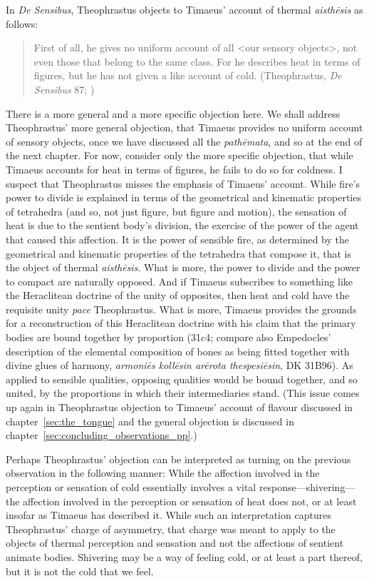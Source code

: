 In \emph{De Sensibus}, Theophrastus objects to Timaeus' account of thermal \emph{aisthēsis} as follows:
\begin{quote}
	First of all, he gives no uniform account of all <our sensory objects>, not even those that belong to the same class. For he describes heat in terms of figures, but he has not given a like account of cold. (Theophrastus, \emph{De Sensibus} 87; \citealt[147]{Stratton:1917vn})
\end{quote}
There is a more general and a more specific objection here. We shall address Theophrastus' more general objection, that Timaeus provides no uniform account of sensory objects, once we have discussed all the \emph{pathēmata}, and so at the end of the next chapter. For now, consider only the more specific objection, that while Timaeus accounts for heat in terms of figures, he fails to do so for coldness. I suspect that Theophrastus misses the emphasis of Timaeus' account. While fire's power to divide is explained in terms of the geometrical and kinematic properties of tetrahedra (and so, not just figure, but figure and motion), the sensation of heat is due to the sentient body's division, the exercise of the power of the agent that caused this affection. It is the power of sensible fire, as determined by the geometrical and kinematic properties of the tetrahedra that compose it, that is the object of thermal \emph{aisthēsis}. What is more, the power to divide and the power to compact are naturally opposed. And if Timaeus subscribes to something like the Heraclitean doctrine of the unity of opposites, then heat and cold have the requisite unity \emph{pace} Theophrastus. What is more, Timaeus provides the grounds for a reconstruction of this Heraclitean doctrine with his claim that the primary bodies are bound together by proportion (31c4; compare also Empedocles' description of the elemental composition of bones as being fitted together with divine glues of harmony, \emph{armoniēs kollēsin arērota thespesiēsin}, DK 31B96). As applied to sensible qualities, opposing qualities would be bound together, and so united, by the proportions in which their intermediaries stand. (This issue comes up again in Theophrastus objection to Timaeus' account of flavour discussed in chapter~\ref{sec:the_tongue} and the general objection is discussed in chapter~\ref{sec:concluding_observations_pp}.)

Perhaps Theophrastus' objection can be interpreted as turning on the previous observation in the following manner: While the affection involved in the perception or sensation of cold essentially involves a vital response---shivering---the affection involved in the perception or sensation of heat does not, or at least insofar as Timaeus has described it. While such an interpretation captures Theophrastus' charge of asymmetry, that charge was meant to apply to the objects of thermal perception and sensation and not the affections of sentient animate bodies. Shivering may be a way of feeling cold, or at least a part thereof, but it is not the cold that we feel.

